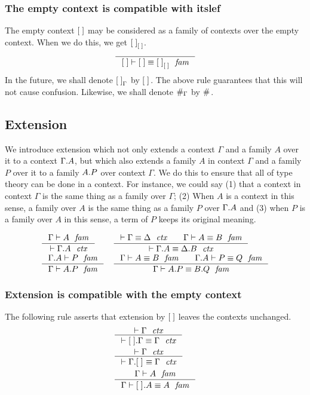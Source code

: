 \subsubsection{The empty context is compatible with itslef}
The empty context $\emptyc$ may be considered as a family of contexts over the empty
context. When we do this, we get $\emptyf[\emptyc]$.
\begin{equation}
\inference{}{\jfameq{\emptyc}{\emptyc}{\emptyf[\emptyc]}}
\end{equation}
In the future, we shall denote $\emptyf[\Gamma]$ by $\emptyf$. The above rule
guarantees that this will not cause confusion. Likewise, we shall denote
$\emptytm[\Gamma]$ by $\emptytm$.

\subsection{Extension}
We introduce extension which not only extends a context $\Gamma$ and a family
$A$ over it to a context $\ctxext{\Gamma}{A}$, but which also extends a family $A$
in context $\Gamma$ and a family $P$ over it to a family $\ctxext{A}{P}$ over context
$\Gamma$. We do this to ensure that all of type theory can be done in a context.
For instance, we could say (1) that a context in context $\Gamma$ is the same thing
as a family over $\Gamma$; (2) When $A$ is a context in this sense, a family over
$A$ is the same thing as a family $P$ over $\ctxext{\Gamma}{A}$ and 
(3) when $P$ is a family over $A$ in this sense, a term of $P$ keeps its original meaning.

\begin{align}
& \inference{\jfam{\Gamma}{A}}{\jctx{\ctxext{\Gamma}{A}}}
& & \inference{\jctxeq{\Gamma}{\Delta}\qquad\jfameq{\Gamma}{A}{B}}{\jctxeq{\ctxext{\Gamma}{A}}{\ctxext{\Delta}{B}}}\\
& \inference{\jfam{{\Gamma}{A}}{P}}{\jfam{\Gamma}{\ctxext{A}{P}}}
& & \inference{\jfameq{\Gamma}{A}{B}\qquad\jfameq{{\Gamma}{A}}{P}{Q}}{\jfameq{\Gamma}{\ctxext{A}{P}}{\ctxext{B}{Q}}}
\end{align}

\subsubsection{Extension is compatible with the empty context}
The following rule asserts that extension by $\emptyc$ leaves the contexts unchanged.
\begin{align}
& \inference{\jctx{\Gamma}}{\jctxeq{\ctxext{\emptyc}{\Gamma}}{\Gamma}}\\
& \inference{\jctx{\Gamma}}{\jctxeq{\ctxext{\Gamma}{\emptyf}}{\Gamma}}\\
& \inference{\jfam{\Gamma}{A}}{\jfameq{\Gamma}{\ctxext{\emptyf}{A}}{A}}
\end{align}

